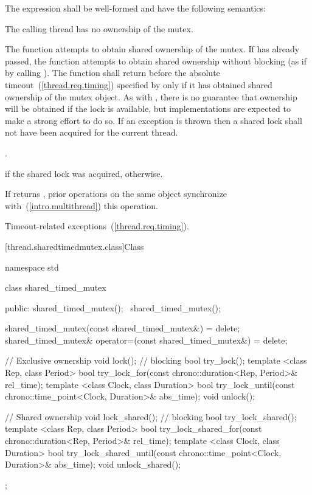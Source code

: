 \pnum
The expression  shall be well-formed
and have the following semantics:

\begin{itemdescr}
\pnum
\requires The calling thread has no ownership of the mutex.

\pnum
\effects The function attempts to obtain shared ownership of the mutex. If
 has already passed, the function attempts to obtain shared
ownership without blocking (as if by calling ). The
function shall return before the absolute timeout~(\ref{thread.req.timing})
specified by  only if it has obtained shared ownership of the
mutex object. \enternote As with , there is no guarantee that
ownership will be obtained if the lock is available, but implementations are
expected to make a strong effort to do so. \exitnote
If an exception is thrown then a shared lock shall not have been acquired for
the current thread.

\pnum
\returntype {}.

\pnum
\returns {} if the shared lock was acquired,  otherwise.

\pnum
\sync If  returns , prior
 operations on the same object synchronize
with~(\ref{intro.multithread}) this operation.

\pnum
\throws Timeout-related exceptions~(\ref{thread.req.timing}).
\end{itemdescr}

[thread.sharedtimedmutex.class]{Class }

\begin{codeblock}
namespace std {
  class shared_timed_mutex {
  public:
    shared_timed_mutex();
    ~shared_timed_mutex();
  
    shared_timed_mutex(const shared_timed_mutex&) = delete;
    shared_timed_mutex& operator=(const shared_timed_mutex&) = delete;
  
    // Exclusive ownership
    void lock();  // blocking
    bool try_lock();
    template <class Rep, class Period>
      bool try_lock_for(const chrono::duration<Rep, Period>& rel_time);
    template <class Clock, class Duration>
      bool try_lock_until(const chrono::time_point<Clock, Duration>& abs_time);
    void unlock();
  
    // Shared ownership
    void lock_shared();  // blocking
    bool try_lock_shared();
    template <class Rep, class Period>
      bool
      try_lock_shared_for(const chrono::duration<Rep, Period>& rel_time);
    template <class Clock, class Duration>
      bool
      try_lock_shared_until(const chrono::time_point<Clock, Duration>& abs_time);
    void unlock_shared();
  };
}
\end{codeblock}

